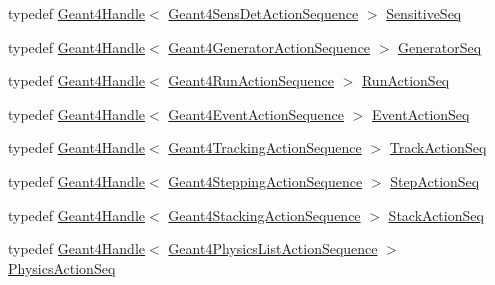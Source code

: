 \begin{DoxyCompactItemize}
\item 
typedef \hyperlink{class_d_d4hep_1_1_simulation_1_1_geant4_handle}{Geant4Handle}$<$ \hyperlink{class_d_d4hep_1_1_simulation_1_1_geant4_sens_det_action_sequence}{Geant4SensDetActionSequence} $>$ \hyperlink{namespace_d_d4hep_1_1_simulation_1_1_setup_a92085f8dfd1adaa9d05d5aeeeb9380b2}{SensitiveSeq}
\item 
typedef \hyperlink{class_d_d4hep_1_1_simulation_1_1_geant4_handle}{Geant4Handle}$<$ \hyperlink{class_d_d4hep_1_1_simulation_1_1_geant4_generator_action_sequence}{Geant4GeneratorActionSequence} $>$ \hyperlink{namespace_d_d4hep_1_1_simulation_1_1_setup_aeb672344cb12e47b674a3ca15d4eddad}{GeneratorSeq}
\item 
typedef \hyperlink{class_d_d4hep_1_1_simulation_1_1_geant4_handle}{Geant4Handle}$<$ \hyperlink{class_d_d4hep_1_1_simulation_1_1_geant4_run_action_sequence}{Geant4RunActionSequence} $>$ \hyperlink{namespace_d_d4hep_1_1_simulation_1_1_setup_ab53cac92250bbb067944b1393760ec72}{RunActionSeq}
\item 
typedef \hyperlink{class_d_d4hep_1_1_simulation_1_1_geant4_handle}{Geant4Handle}$<$ \hyperlink{class_d_d4hep_1_1_simulation_1_1_geant4_event_action_sequence}{Geant4EventActionSequence} $>$ \hyperlink{namespace_d_d4hep_1_1_simulation_1_1_setup_a4be5336a4ddd9dee751fc71c1f391c38}{EventActionSeq}
\item 
typedef \hyperlink{class_d_d4hep_1_1_simulation_1_1_geant4_handle}{Geant4Handle}$<$ \hyperlink{class_d_d4hep_1_1_simulation_1_1_geant4_tracking_action_sequence}{Geant4TrackingActionSequence} $>$ \hyperlink{namespace_d_d4hep_1_1_simulation_1_1_setup_a5266c2f851adc926f84380c385c8dca4}{TrackActionSeq}
\item 
typedef \hyperlink{class_d_d4hep_1_1_simulation_1_1_geant4_handle}{Geant4Handle}$<$ \hyperlink{class_d_d4hep_1_1_simulation_1_1_geant4_stepping_action_sequence}{Geant4SteppingActionSequence} $>$ \hyperlink{namespace_d_d4hep_1_1_simulation_1_1_setup_ab53ef7047293eb31171e955f62418eaf}{StepActionSeq}
\item 
typedef \hyperlink{class_d_d4hep_1_1_simulation_1_1_geant4_handle}{Geant4Handle}$<$ \hyperlink{class_d_d4hep_1_1_simulation_1_1_geant4_stacking_action_sequence}{Geant4StackingActionSequence} $>$ \hyperlink{namespace_d_d4hep_1_1_simulation_1_1_setup_a4b1936ec223ba4447955c468db61490f}{StackActionSeq}
\item 
typedef \hyperlink{class_d_d4hep_1_1_simulation_1_1_geant4_handle}{Geant4Handle}$<$ \hyperlink{class_d_d4hep_1_1_simulation_1_1_geant4_physics_list_action_sequence}{Geant4PhysicsListActionSequence} $>$ \hyperlink{namespace_d_d4hep_1_1_simulation_1_1_setup_a4a1525b46f6b47a7c7654bf3b79ea3ce}{PhysicsActionSeq}

\end{DoxyCompactItemize}

